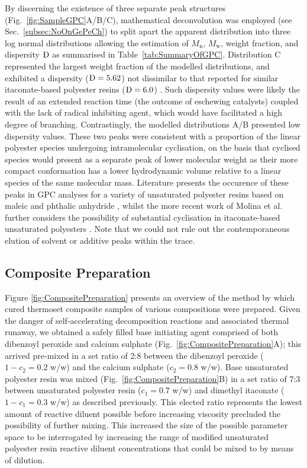 By discerning the existence of three separate peak structures 
 (Fig.~\ref{fig:SampleGPC}A/B/C), mathematical deconvolution was employed
 (see Sec.~\ref{subsec:NoOnGePeCh}) to split apart the apparent
 distribution into three log normal distributions allowing the estimation
 of \(M_{\text{n}}\), \(M_{\text{w}}\), weight fraction, and
 dispersity \(\text{\DJ}\) as summarised in Table~\ref{tab:SummaryOfGPC}.
Distribution C represented the largest weight fraction of the modelled 
 distributions, and exhibited a dispersity (\(\text{\DJ}=5.62\)) not dissimilar
 to that reported for similar itaconate-based polyester resins
 (\(\text{\DJ}=6.0\)) \autocite{Bamane2020}.
Such dispersity values were likely the result of an extended reaction
 time (the outcome of eschewing catalysts) coupled with the lack of
 radical inhibiting agent, which would have facilitated a high degree of
 branching.
Contrastingly, the modelled distributions A/B presented low dispersity
 values.
These two peaks were consistent with a proportion of the linear polyester
 species undergoing intramolecular cyclisation, on the basis that
 cyclised species would present as a separate peak of lower molecular 
 weight as their more compact conformation has a lower hydrodynamic volume 
 relative to a linear species of the same molecular mass.
Literature presents the occurence of these peaks in GPC analyses for 
 a variety of unsaturated polyester resins based on maleic and phthalic
 anhydride \autocite{Cristobal1993,Podzimek1990,Cristobal1991b}, whilst
 the more recent work of Molina et al. further considers the possibility of
 substantial cyclisation in itaconate-based unsaturated polyesters
 \autocite{Molina2020}.
Note that we could not rule out the contemporaneous
 elution of solvent or additive peaks within the trace.

\subsection{Composite Preparation}
Figure \ref{fig:CompositePreparation} presents an overview of the method by
 which cured thermoset composite samples of various compositions were
 prepared.
Given the danger of self-accelerating decomposition reactions and 
 associated thermal runaway, we obtained a safely filled base initiating
 agent comprised of both dibenzoyl peroxide and calcium sulphate
 (Fig.~\ref{fig:CompositePreparation}A); this arrived pre-mixed in a set 
 ratio of 2:8 between the dibenzoyl peroxide (\(1-c_{2}=0.2\) w/w) and the
 calcium sulphate (\(c_{2}=0.8\) w/w).
Base unsaturated polyester resin was mixed
 (Fig.~\ref{fig:CompositePreparation}B) in a set ratio of 7:3 between
 unsaturated polyester resin (\(c_{1}=0.7\) w/w) and dimethyl
 itaconate (\(1-c_{1}=0.3\) w/w) as described previously.
This elected ratio represents the lowest amount of reactive diluent 
 possible before increasing viscosity precluded the possibility of 
 further mixing.
This increased the size of the possible parameter space 
 to be interrogated by increasing the range of modified unsaturated 
 polyester resin reactive diluent concentrations that could be mixed 
 to by means of dilution.

